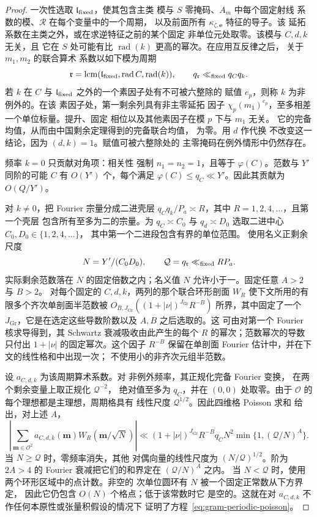 \begin{proof}
一次性选取 $\mathfrak l_{\rm fixed}$，使其包含主类
模与 $S$ 零掩码、$A_m$ 中每个固定射线
系数的模、$\mathcal R$ 在每个变量中的一个周期，
以及前面所有
$\kappa_{\zeta,\boldsymbol e}$ 特征的导子。该
延拓系数在主类之外，或在求逆特征之前的某个固定
非单位元处取零。该模与 $C,d,k$ 无关，且
它在 $S$ 处可能有比 $\operatorname{rad}(k)$ 更高的幂次。在应用互反律之后，
关于 $m_1,m_2$ 的联合算术
系数以如下模为周期
\[
 \mathfrak r=\operatorname{lcm}
   (\mathfrak l_{\rm fixed},\operatorname{rad}C,\operatorname{rad}(k)),
 \qquad q_{\mathfrak r}\ll_{\rm fixed}q_Cq_k.
\]
若 $k$ 在 $C$ 与 $\mathfrak l_{\rm fixed}$ 之外的一个素因子处有不可被六整除的
赋值 $e_p$，则称 $k$ 为非例外的。在该
素因子处，第一剩余列具有非主零延拓
因子 $\chi_p(m_1)^{e_p}$，至多相差一个单位标量。提升、固定
相位以及其他素因子在模 $p$ 下与 $m_1$ 无关。
它的完备均值，从而由中国剩余定理得到的完备联合均值，
为零。用 $d$ 作代换
不改变这一结论，因为 $(d,k)=1$。赋值可被六整除处的
主零掩码在例外情形中仍然存在。

频率 $k=0$ 只贡献对角项：相关性
强制 $n_1=n_2=1$，且等于 $\varphi(C)$。范数与 $Y'$
同阶的可能 $C$ 有 $O(Y')$ 个，每个满足
$\varphi(C)\le q_C\ll Y'$。因此其贡献为
$O(Q/Y')$。

对 $k\ne0$，把 Fourier 宗量分成二进壳层
$q_Cq_k/P_a\asymp R$，其中 $R=1,2,4,\ldots$，且第一个壳层
包含所有至多为二的宗量。为 $q_C\asymp C_0$ 与
$q_d\asymp D_0$ 选取二进中心 $C_0,D_0\in\{1,2,4,\ldots\}$，
其中第一个二进段包含有界的单位范围。
使用名义正剩余尺度
\[
 N=Y'/(C_0D_0),\qquad
 \mathcal Q=q_{\mathfrak r}\ll_{\rm fixed}RP_a.
\]
实际剩余范数落在 $N$ 的固定倍数之内；名义值
$N$ 允许小于一。固定任意 $A>2$ 与 $B>2$。
对每个固定的 $C,d,k$，两列的那个联合环形剖面 $W_R$
使下文所用的有限多个齐次单剖面半范数被
$O_{B,J_{\mathrm{Gr}}}((1+|\nu|)^{J_{\mathrm{Gr}}} R^{-B})$ 所界，其中固定了一个
$J_{\mathrm{Gr}}$，它是在选定这些导数阶数以及 $A,B$ 之后选取的。这
可由对第一个 Fourier 核求导得到，其 Schwartz 衰减吸收由此产生的每个
$R$ 的幂次；范数幂次的导数只付出
$1+|\nu|$ 的固定幂次。这个因子 $R^{-B}$ 保留在单剖面
Fourier 估计中，并在下文的线性格和中出现一次；
不使用小的非齐次元组半范数。

设 $a_{C,d,k}$ 为该周期算术系数。对
非例外频率，其正规化完备 Fourier 变换，
在两个剩余变量上取正规化 $\mathcal Q^{-2}$，
绝对值至多为 $q_C$，并在 $(0,0)$ 处取零。由于
$\mathcal O$ 的每个理想都是主理想，周期格具有
线性尺度 $\mathcal Q^{1/2}$。因此四维格 Poisson 求和
给出，对上述 $A$，
\begin{equation}
 \left|\sum_{\mathbf m\in\mathcal O^2}
       a_{C,d,k}(\mathbf m)W_R(\mathbf m/\sqrt N)\right|
 \ll (1+|\nu|)^{J_{\mathrm{Gr}}} R^{-B}q_C N^2
             \min\{1,(\mathcal Q/N)^A\}.
 \label{eq:gram-periodic-poisson}
\end{equation}
当 $N\ge\mathcal Q$ 时，零频率消失，其他
对偶向量的线性尺度为 $(N/\mathcal Q)^{1/2}$。阶为
$2A>4$ 的 Fourier
衰减把它们的和界定在 $(\mathcal Q/N)^A$ 之内。
当 $N<\mathcal Q$ 时，使用两个环形区域中的点计数。非空的
次单位圆环有 $N$ 被一个固定正常数从下方界定，
因此它仍包含 $O(N)$ 个格点；低于该常数时它
是空的。这就在对 $a_{C,d,k}$ 不作任何本原性或张量积假设的情况下
证明了方程~\eqref{eq:gram-periodic-poisson}。


\end{proof}
